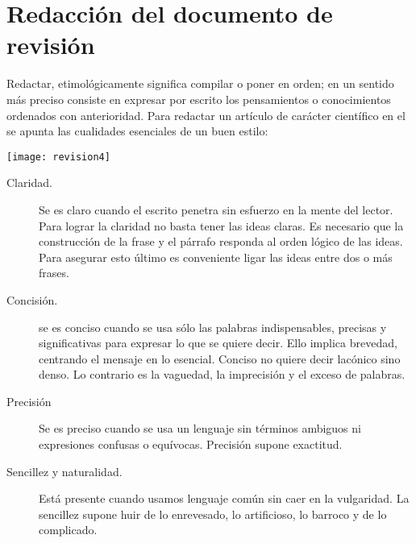 
\setchapterpreamble[u]{\margintoc}

\chapter{Redacción  del documento de revisión }
\label{ch:org-info}



 Redactar, etimológicamente significa compilar o poner en orden; en un sentido más preciso consiste en expresar por escrito los pensamientos o conocimientos ordenados con anterioridad. Para redactar un artículo de carácter científico  en el \GU  se  apunta las cualidades esenciales de un buen estilo: 
 
 \begin{marginfigure}[-1.2cm]%
 	\texttt{[image: revision4]}
 \end{marginfigure}
 
 
 
 \begin{description}
 	\item [Claridad.] Se es claro cuando el escrito penetra sin esfuerzo en la mente del lector. Para lograr la claridad no basta tener las ideas claras. Es necesario que la construcción de la frase y el párrafo responda al orden lógico de las ideas. Para asegurar esto último es conveniente ligar las ideas entre dos o más frases. 
 	
 	\item[Concisión.] se es conciso cuando se usa sólo las palabras indispensables, precisas y significativas para expresar lo que se quiere decir. Ello implica brevedad, centrando el mensaje en lo esencial. Conciso no quiere decir lacónico sino denso. Lo contrario es la vaguedad, la imprecisión y el exceso de palabras. 
 	
 	\item[Precisión] Se es preciso cuando se usa un lenguaje sin términos ambiguos ni expresiones confusas o equívocas. Precisión supone exactitud. 
 	
 	\item[Sencillez y naturalidad.] Está presente cuando usamos lenguaje común sin caer en la vulgaridad. La sencillez supone huir de lo enrevesado, lo artificioso, lo barroco y de lo complicado.
 	
 \end{description}

